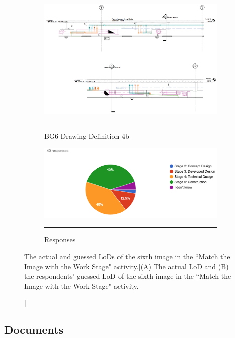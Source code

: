 \begin{figure}[htbp]
\centering
  \begin{subfigure}[b]{.35\textwidth}
  \centering
  \includegraphics[width=\textwidth]{figures/4bCoordDwg02.png}
		\rule{\textwidth}{0.5pt} %
  \caption{BG6 Drawing Definition 4b}
  \label{}
\end{subfigure}
  \begin{subfigure}[b]{.61\textwidth}
  \centering
  \includegraphics[width=\textwidth]{figures/image6.png}
		\rule{\textwidth}{0.5pt} %
  \caption{Responses}
  \label{}
\end{subfigure}
\caption[The actual and guessed LoDs of the sixth image in the ``Match the Image with the Work Stage" activity.]{({\scriptsize A}) The actual LoD and ({\scriptsize B}) the respondents’ guessed LoD of the sixth image in the ``Match the Image with the Work Stage" activity.}
\label{image6}
\end{figure}





\newpage
\subsection{Documents}

